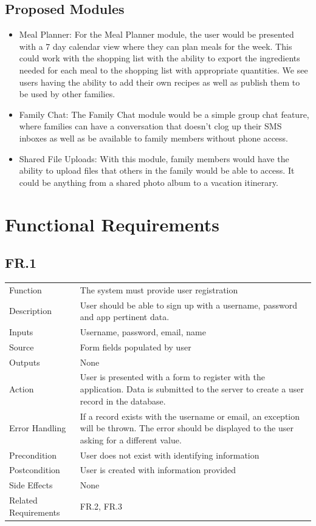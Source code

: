 \documentclass[12pt]{article}
\begin{document}
\subsection{Proposed Modules}
\begin{itemize}
    \item Meal Planner: For the Meal Planner module, the user would be presented with a 7 day calendar view where they can
            plan meals for the week. This could work with the shopping list with the ability to export the ingredients needed
            for each meal to the shopping list with appropriate quantities. We see users having the ability to add their own recipes
            as well as publish them to be used by other families.
    \item Family Chat: The Family Chat module would be a simple group chat feature, where families can have a conversation that 
            doesn't clog up their SMS inboxes as well as be available to family members without phone access.
    \item Shared File Uploads: With this module, family members would have the ability to upload files that others in the family
            would be able to access. It could be anything from a shared photo album to a vacation itinerary.
\end{itemize}
\section{Functional Requirements}
    \subsection*{FR.1}
    \begin{center}
        \begin{tabular}{| p{10em} p{26em} |}
        \hline
         Function &  The system must provide user registration\\
         Description & User should be able to sign up with a username, password and app pertinent data. \\
         Inputs & Username, password, email, name\\
         Source & Form fields populated by user\\
         Outputs & None\\
         Action & User is presented with a form to register with the application. Data is submitted to the server to create a user record in the database.\\
         Error Handling & If a record exists with the username or email, an exception will be thrown. The error should be displayed to the user asking for a different value.\\
         Precondition & User does not exist with identifying information\\
         Postcondition & User is created with information provided\\
         Side Effects & None \\
         Related Requirements & FR.2, FR.3\\
         \hline
        \end{tabular}
    \end{center}
\end{document}
